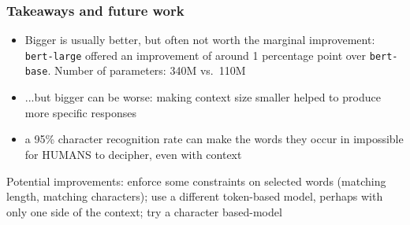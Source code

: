 \documentclass[../main.tex]{subfiles}
\begin{document}
\begin{frame}[fragile]
	\frametitle{Takeaways and future work}
	\begin{itemize}
	\item
	Bigger is usually better, but often not worth the marginal improvement:
	\verb|bert-large| offered an improvement of around 1 percentage point over
	\verb|bert-base|. Number of parameters: 340M vs.\ 110M
	\item
	...but bigger can be worse: making context size smaller helped to produce
	more specific responses
	\item
	a 95\% character recognition rate can make the words they occur in
	impossible for HUMANS to decipher, even with context
	\end{itemize}

	Potential improvements: enforce some constraints on selected words (matching
	length, matching characters); use a different token-based model, perhaps with only
	one side of the context; try a character based-model
\end{frame}
\end{document}
